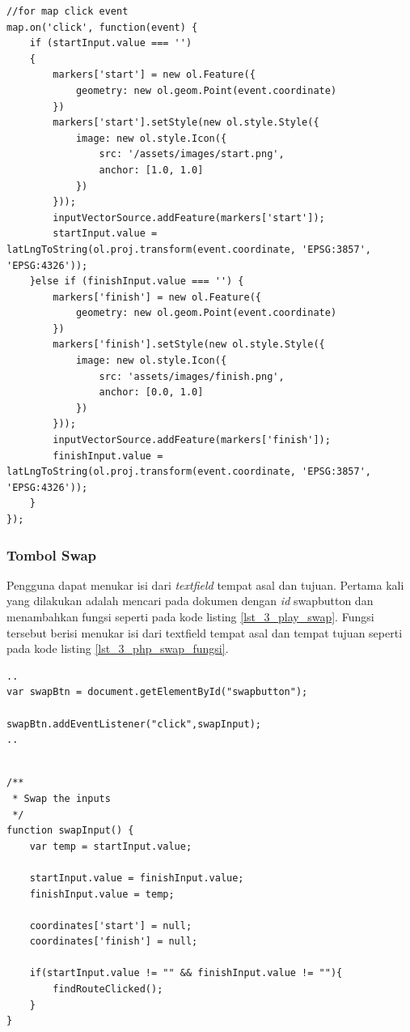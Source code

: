 	\begin{lstlisting}[caption=Membuat \textit{event} klik pada peta,label = {lst_3_play_textfield_koord_kode}]
//for map click event
map.on('click', function(event) {
    if (startInput.value === '')
    {
        markers['start'] = new ol.Feature({
            geometry: new ol.geom.Point(event.coordinate)
        })
        markers['start'].setStyle(new ol.style.Style({
            image: new ol.style.Icon({
                src: '/assets/images/start.png',
                anchor: [1.0, 1.0]
            })
        }));
        inputVectorSource.addFeature(markers['start']);
        startInput.value = latLngToString(ol.proj.transform(event.coordinate, 'EPSG:3857', 'EPSG:4326'));
    }else if (finishInput.value === '') {
        markers['finish'] = new ol.Feature({
            geometry: new ol.geom.Point(event.coordinate)
        })
        markers['finish'].setStyle(new ol.style.Style({
            image: new ol.style.Icon({
                src: 'assets/images/finish.png',
                anchor: [0.0, 1.0]
            })
        }));
        inputVectorSource.addFeature(markers['finish']);
        finishInput.value = latLngToString(ol.proj.transform(event.coordinate, 'EPSG:3857', 'EPSG:4326'));
    }
});

\end{lstlisting}

\subsubsection{Tombol Swap}
Pengguna dapat menukar isi dari \textit{textfield} tempat asal dan tujuan. Pertama kali yang dilakukan adalah mencari pada dokumen dengan \textit{id} swapbutton dan menambahkan fungsi seperti pada kode listing \ref{lst_3_play_swap}. Fungsi tersebut berisi menukar isi dari textfield tempat asal dan tempat tujuan seperti pada kode listing \ref{lst_3_php_swap_fungsi}.

\begin{lstlisting}[caption=\textit{Method} untuk memanggil fungsi JavaScript ketika tombol \textit{swap} ditekan ,label = {lst_3_play_swap}]
..
var swapBtn = document.getElementById("swapbutton");

swapBtn.addEventListener("click",swapInput);
..
\end{lstlisting}

\begin{lstlisting}[caption=Fungsi JavaScript untuk menukar isi \textit{textfield} tempat asal dan tujuan ,label = {lst_3_pplay_swap_fungsi}]	

/**
 * Swap the inputs
 */
function swapInput() {
    var temp = startInput.value;

    startInput.value = finishInput.value;
    finishInput.value = temp;

    coordinates['start'] = null;
    coordinates['finish'] = null;
    
    if(startInput.value != "" && finishInput.value != ""){
        findRouteClicked();
    }
}
\end{lstlisting}

